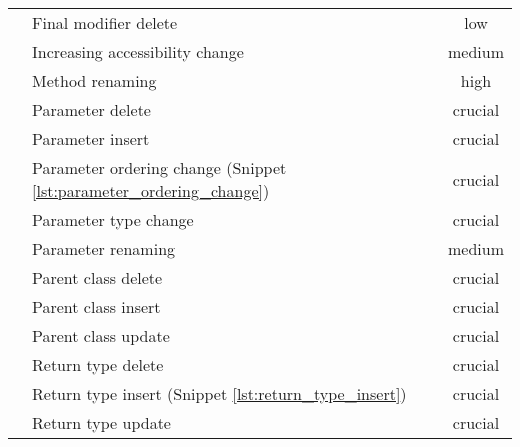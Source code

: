 \begin{longtable}{D{0.4} X c}
& Final modifier delete & low \\
& Increasing accessibility change & medium \\
& Method renaming & high \\
& Parameter delete & crucial \\
& Parameter insert & crucial \\
& Parameter ordering change (Snippet \ref{lst:parameter_ordering_change})& crucial \\
& Parameter type change & crucial \\
& Parameter renaming & medium \\
& Parent class delete & crucial \\
& Parent class insert & crucial \\
& Parent class update & crucial \\
& Return type delete & crucial \\
& Return type insert (Snippet \ref{lst:return_type_insert})& crucial \\
& Return type update & crucial \\
\bottomrule
\end{longtable}